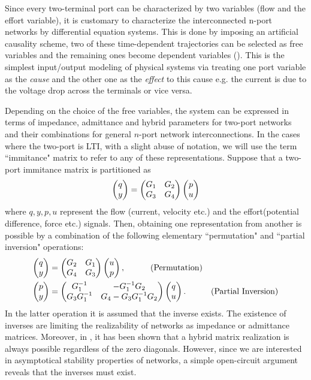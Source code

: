 Since every two-terminal port can be characterized by two variables (flow and the effort variable), it is customary to characterize the interconnected
n-port networks by differential equation systems. This is done by imposing an artificial causality scheme, 
two of these time-dependent trajectories can be selected as free variables and the remaining ones become dependent variables 
(\cite{behavbook}). This is the simplest input/output modeling of physical systems via treating one port variable as the 
\emph{cause} and the other one as the \emph{effect} to this cause e.g. the current is due to the voltage drop across the terminals or 
vice versa. 

Depending on the choice of the free variables, the system can be expressed in terms of impedance, admittance 
and hybrid parameters for two-port networks and their combinations for general $n$-port network interconnections. 
In the cases where the two-port is LTI, with a slight abuse of notation, we will use the term ``immitance" matrix to refer to 
any of these representations. Suppose that a two-port immitance matrix is partitioned as
\[
\begin{pmatrix}q\\y\end{pmatrix}=\begin{pmatrix}G_1 &G_2\\G_3 &G_4\end{pmatrix}\begin{pmatrix}p\\u\end{pmatrix}
\]
where $q,y,p,u$ represent the flow (current, velocity etc.) and the effort(potential difference, force etc.) signals. Then, 
obtaining one representation from another is possible by a combination of the following elementary ``permutation" and 
``{partial} inversion" operations:
\begin{align*}
\pmatr{q\\y}&=\pmatr{G_2 &G_1\\G_4 &G_3}\pmatr{u\\p}, \ \ \ \tag{Permutation}\\
\pmatr{p\\y}&=\pmatr{\inv{G_1} &-\inv{G_1}G_2\\G_3\inv{G_1} &G_4-G_3\inv{G_1}G_2}\pmatr{q\\u}. \ \ \ \tag{Partial Inversion}
\end{align*}
In the latter operation it is assumed that the inverse exists. The existence of inverses are limiting the realizability
of networks as impedance or admittance matrices. Moreover, in \cite{andersonHmat}, it has been shown that a hybrid matrix
realization is always possible regardless of the zero diagonals. However, since we are interested in asymptotical stability
properties of networks, a simple open-circuit argument reveals that the inverses must exist.

